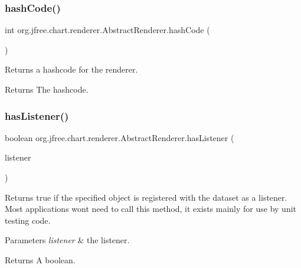 \subsubsection{\texorpdfstring{hash\+Code()}{hashCode()}}
{\footnotesize\ttfamily int org.\+jfree.\+chart.\+renderer.\+Abstract\+Renderer.\+hash\+Code (\begin{DoxyParamCaption}{ }\end{DoxyParamCaption})}

Returns a hashcode for the renderer.

\begin{DoxyReturn}{Returns}
The hashcode. 
\end{DoxyReturn}
\mbox{\label{classorg_1_1jfree_1_1chart_1_1renderer_1_1_abstract_renderer_ab66450a3f4402b9cf9a51b2b9b742909}} 
\subsubsection{\texorpdfstring{has\+Listener()}{hasListener()}}
{\footnotesize\ttfamily boolean org.\+jfree.\+chart.\+renderer.\+Abstract\+Renderer.\+has\+Listener (\begin{DoxyParamCaption}\item[{Event\+Listener}]{listener }\end{DoxyParamCaption})}

Returns {\ttfamily true} if the specified object is registered with the dataset as a listener. Most applications won\textquotesingle{}t need to call this method, it exists mainly for use by unit testing code.


\begin{DoxyParams}{Parameters}
{\em listener} & the listener.\\
\hline
\end{DoxyParams}
\begin{DoxyReturn}{Returns}
A boolean. 
\end{DoxyReturn}
\mbox{\label{classorg_1_1jfree_1_1chart_1_1renderer_1_1_abstract_renderer_aa704c4daa5df872b3c85878e69a0a426}} 
